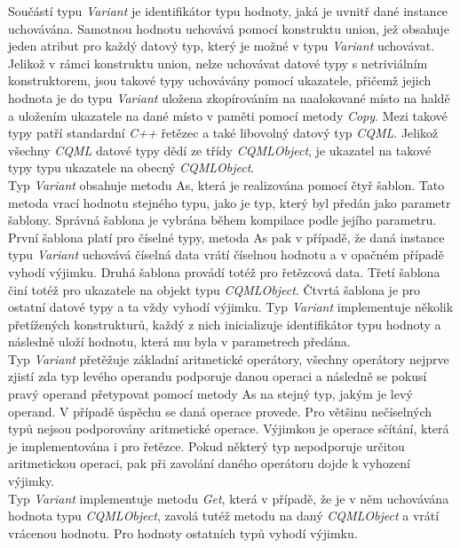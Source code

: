\documentclass[11pt,twoside,a4paper]{book}
\begin{document}
Součástí typu \textit{Variant} je identifikátor typu hodnoty, jaká je uvnitř dané instance uchovávána. Samotnou hodnotu uchovává pomocí konstruktu union, jež obsahuje jeden atribut pro každý datový typ, který je možné v typu \textit{Variant} uchovávat. Jelikož v rámci konstruktu union, nelze uchovávat datové typy s netriviálním konstruktorem, jsou takové typy uchovávány pomocí ukazatele, přičemž jejich hodnota je do typu \textit{Variant} uložena zkopírováním na naalokované místo na haldě a uložením ukazatele na dané místo v paměti pomocí metody \textit{Copy}. Mezi takové typy patří standardní \textit{C++} řetězec a také libovolný datový typ \textit{CQML}. Jelikož všechny \textit{CQML} datové typy dědí ze třídy \textit{CQMLObject}, je ukazatel na takové typy typu ukazatele na obecný \textit{CQMLObject}.\\
Typ \textit{Variant} obsahuje metodu As, která je realizována pomocí čtyř šablon. Tato metoda vrací hodnotu stejného typu, jako je typ, který byl předán jako parametr šablony. Správná šablona je vybrána během kompilace podle jejího parametru. První šablona platí pro číselné typy, metoda As pak v případě, že daná instance typu \textit{Variant} uchovává číselná data vrátí číselnou hodnotu a v opačném případě vyhodí výjimku. Druhá šablona provádí totéž pro řetězcová data. Třetí šablona činí totéž pro ukazatele na objekt typu \textit{CQMLObject}. Čtvrtá šablona je pro ostatní datové typy a ta vždy vyhodí výjimku.
Typ \textit{Variant} implementuje několik přetížených konstrukturů, každý z nich inicializuje identifikátor typu hodnoty a následně uloží hodnotu, která mu byla v parametrech předána.\\
Typ \textit{Variant} přetěžuje základní aritmetické operátory, všechny operátory nejprve zjistí zda typ levého operandu podporuje danou operaci a následně se pokusí pravý operand přetypovat pomocí metody As na stejný typ, jakým je levý operand. V případě úspěchu se daná operace provede. Pro většinu nečíselných typů nejsou podporovány aritmetické operace. Výjimkou je operace sčítání, která je implementována i pro řetězce. Pokud některý typ nepodporuje určitou aritmetickou operaci, pak při zavolání daného operátoru dojde k vyhození výjimky.\\
Typ \textit{Variant} implementuje metodu \textit{Get}, která v případě, že je v něm uchovávána hodnota typu \textit{CQMLObject}, zavolá tutéž metodu na daný \textit{CQMLObject} a vrátí vrácenou hodnotu. Pro hodnoty ostatních typů vyhodí výjimku.
\end{document}

